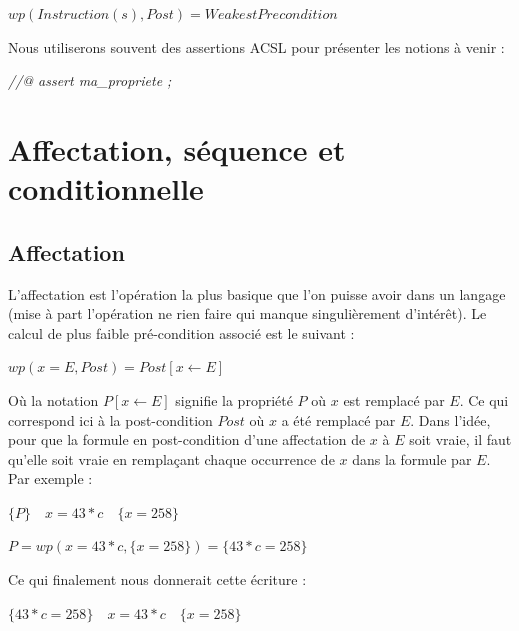 \documentclass[12pt,francais,]{scrbook}
\newenvironment{Shaded}{}{}
\newcommand{\CommentTok}[1]{\textcolor[rgb]{0.38,0.63,0.69}{\textit{{#1}}}}
\begin{document}
\(wp(Instruction(s), Post) = WeakestPrecondition\)

Nous utiliserons souvent des assertions ACSL pour présenter les notions
à venir :

\begin{footnotesize}\begin{Shaded}
\begin{Highlighting}[]
\CommentTok{//@ assert ma_propriete ;}
\end{Highlighting}
\end{Shaded}\end{footnotesize}

\section{Affectation, séquence et
conditionnelle}\label{affectation-suxe9quence-et-conditionnelle}

\subsection{Affectation}\label{affectation}

L'affectation est l'opération la plus basique que l'on puisse avoir dans
un langage (mise à part l'opération \og{}ne rien faire\fg{} qui manque
singulièrement d'intérêt). Le calcul de plus faible pré-condition
associé est le suivant :

\begin{center} \(wp(x = E , Post) = Post[x \leftarrow E]\) \end{center}

Où la notation \(P[x \leftarrow E]\) signifie \og{}la propriété \(P\) où
\(x\) est remplacé par \(E\)\fg{}. Ce qui correspond ici à \og{}la
post-condition \(Post\) où \(x\) a été remplacé par \(E\)\fg{}. Dans
l'idée, pour que la formule en post-condition d'une affectation de \(x\)
à \(E\) soit vraie, il faut qu'elle soit vraie en remplaçant chaque
occurrence de \(x\) dans la formule par \(E\). Par exemple :

\begin{center} \(\{P\}\quad x = 43*c \quad \{ x = 258 \}\) \end{center}

\begin{center} \(P = wp(x = 43*c , \{x = 258\}) = \{43*c = 258\}\)
\end{center}

Ce qui finalement nous donnerait cette écriture :

\begin{center} \(\{43*c = 258\}\quad x = 43*c\quad \{ x = 258 \}\)
\end{center}
\end{document}
